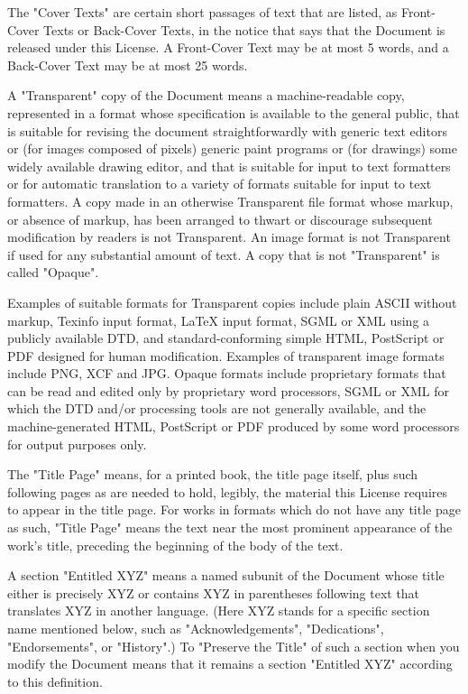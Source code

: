 \documentclass[11pt]{article}
\begin{document}
The "Cover Texts" are certain short passages of text that are listed,
as Front-Cover Texts or Back-Cover Texts, in the notice that says that
the Document is released under this License.  A Front-Cover Text may
be at most 5 words, and a Back-Cover Text may be at most 25 words.

A "Transparent" copy of the Document means a machine-readable copy,
represented in a format whose specification is available to the
general public, that is suitable for revising the document
straightforwardly with generic text editors or (for images composed of
pixels) generic paint programs or (for drawings) some widely available
drawing editor, and that is suitable for input to text formatters or
for automatic translation to a variety of formats suitable for input
to text formatters.  A copy made in an otherwise Transparent file
format whose markup, or absence of markup, has been arranged to thwart
or discourage subsequent modification by readers is not Transparent.
An image format is not Transparent if used for any substantial amount
of text.  A copy that is not "Transparent" is called "Opaque".

Examples of suitable formats for Transparent copies include plain
ASCII without markup, Texinfo input format, LaTeX input format, SGML
or XML using a publicly available DTD, and standard-conforming simple
HTML, PostScript or PDF designed for human modification.  Examples of
transparent image formats include PNG, XCF and JPG.  Opaque formats
include proprietary formats that can be read and edited only by
proprietary word processors, SGML or XML for which the DTD and/or
processing tools are not generally available, and the
machine-generated HTML, PostScript or PDF produced by some word
processors for output purposes only.

The "Title Page" means, for a printed book, the title page itself,
plus such following pages as are needed to hold, legibly, the material
this License requires to appear in the title page.  For works in
formats which do not have any title page as such, "Title Page" means
the text near the most prominent appearance of the work's title,
preceding the beginning of the body of the text.

A section "Entitled XYZ" means a named subunit of the Document whose
title either is precisely XYZ or contains XYZ in parentheses following
text that translates XYZ in another language.  (Here XYZ stands for a
specific section name mentioned below, such as "Acknowledgements",
"Dedications", "Endorsements", or "History".)  To "Preserve the Title"
of such a section when you modify the Document means that it remains a
section "Entitled XYZ" according to this definition.
\end{document}
